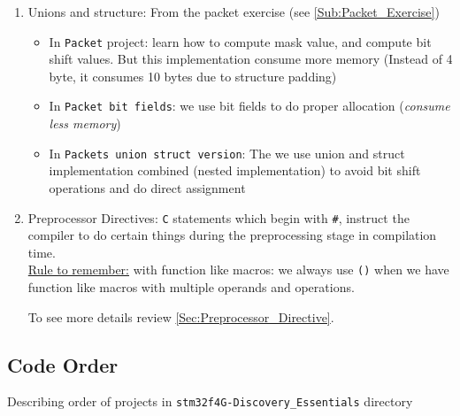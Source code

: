 \begin{enumerate}
\item Unions and structure: From the packet exercise (see \autoref{Sub:Packet_Exercise})

\begin{itemize}
    \item In \verb|Packet| project: learn how to compute mask value, and compute bit shift values. But this implementation consume more memory (Instead of 4 byte, it consumes 10 bytes due to structure padding)
    
    \item In \verb|Packet bit fields|: we use bit fields to do proper allocation (\textit{consume less memory})
    
    \item In \verb|Packets union struct version|: The we use union and struct implementation combined (nested implementation) to avoid bit shift operations and do direct assignment
    
 
\end{itemize}

\item Preprocessor Directives: \verb|C| statements which begin with \verb|#|, instruct the compiler to do certain things during the preprocessing stage in compilation time.\\

\underline{Rule to remember:} with function like macros: we always use \verb|()| when we have function like macros with multiple operands and operations.

To see more details review \autoref{Sec:Preprocessor_Directive}.
   
\end{enumerate}

\newpage
\subsection{Code Order}

Describing order of projects in \verb|stm32f4G-Discovery_Essentials| directory

